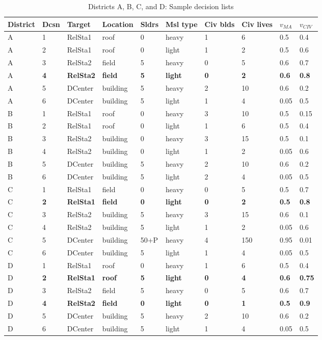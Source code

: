 \begin{table}[!htb]
\footnotesize
\caption{Districts A, B, C, and D: Sample decision lists}
\label{table:1}
\begin{tabular}{|l|l|l|l|l|l|l|l|l|l|} 
\hline
District & Dcsn & Target & Location & Sldrs & Msl type &  Civ blds & Civ lives & $v_{MA}$ & $v_{CIV}$ \\ [0.5ex] 
\hline
A & 1 & RelSta1 & roof & 0 & heavy & 1 & 6 & 0.5 & 0.4 \\
A & 2 & RelSta1 &  roof& 0 & light & 1 & 2 & 0.5 & 0.6 \\
A & 3 & RelSta2 & field & 5 & heavy & 0 & 5 & 0.6 & 0.7 \\
A & \textbf{4} & \textbf{RelSta2} & \textbf{field} &\textbf{5} & \textbf{light} & \textbf{0} & \textbf{2} & \textbf{0.6} & \textbf{0.8} \\
A & 5 & DCenter & building & 5 & heavy & 2 & 10 & 0.6 & 0.2 \\
A & 6 & DCenter & building & 5 & light & 1 & 4 & 0.05 & 0.5 \\
\hline
\hline
B & 1 & RelSta1 & roof & 0 & heavy & 3 & 10 & 0.5 & 0.15 \\
B & 2 & RelSta1 & roof & 0 & light & 1 & 6 & 0.5 & 0.4 \\
B & 3 & RelSta2 & building & 0 & heavy & 3 & 15 & 0.5 & 0.1 \\
B & 4 & RelSta2 & building & 0 & light & 1 & 2 & 0.05 & 0.6 \\
B & 5 & DCenter & building & 5 & heavy & 2 & 10 & 0.6 & 0.2 \\
B & 6 & DCenter & building & 5 & light & 2 & 4 & 0.05 & 0.5 \\
\hline
\hline
C & 1 & RelSta1 & field & 0 & heavy & 0 & 5 & 0.5 & 0.7 \\
C & \textbf{2} & \textbf{RelSta1} & \textbf{field} & \textbf{0} & \textbf{light} & \textbf{0} & \textbf{2} & \textbf{0.5} & \textbf{0.8} \\
C & 3 & RelSta2 & building & 5 & heavy & 3 & 15 & 0.6 & 0.1 \\
C & 4 & RelSta2 & building & 5 & light & 1 & 2 & 0.05 & 0.6 \\
C & 5 & DCenter & building & 50+P & heavy & 4 & 150 & 0.95 & 0.01 \\
C & 6 & DCenter & building & 5 & light & 1 & 4 & 0.05 & 0.5 \\
\hline
\hline
D & 1 & RelSta1 & roof & 0 & heavy & 1 & 6 & 0.5 & 0.4 \\
D & \textbf{2} & \textbf{RelSta1} &  \textbf{roof} & \textbf{5} & \textbf{light} & \textbf{0} & \textbf{4} & \textbf{0.6} & \textbf{0.75} \\
D & 3 & RelSta2 & field & 5 & heavy & 0 & 5 & 0.6 & 0.7 \\
D & \textbf{4} & \textbf{RelSta2} & \textbf{field} &\textbf{0} & \textbf{light} & \textbf{0} & \textbf{1} & \textbf{0.5} & \textbf{0.9} \\
D & 5 & DCenter & building & 5 & heavy & 2 & 10 & 0.6 & 0.2 \\
D & 6 & DCenter & building & 5 & light & 1 & 4 & 0.05 & 0.5 \\
\hline
\end{tabular}

\end{table}

